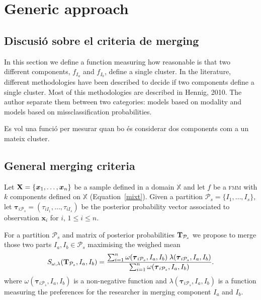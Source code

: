 \documentclass[submit]{smj}
\theoremstyle{definition}
\newcommand{\m}[1]{\boldsymbol{#1}}
\newcommand{\fmm}{\textsc{fmm}\xspace}
\begin{document}
\section{Generic approach}\label{generic_merging}
\subsection{Discusió sobre el criteria de merging}

In this section we define a function measuring how reasonable is that two different components, $f_{I_a}$ and $f_{I_b}$, define a single cluster. In the literature, different methodologies have been described to decide if two components define a single cluster. Most of this methodologies are described in Hennig, 2010. The author separate them between two categories: models based on modality and models based on missclassification probabilities.


Es vol una funció per mesurar quan bo és considerar dos components com a un mateix cluster.

\subsection{General merging criteria}\label{merging_criteria}

Let $\text{\textbf{X}} = \{\m x_1,\dots,\m x_n \}$ be a sample defined in  a domain $\mathbb{X}$ and let $f$ be a \fmm with $k$ components defined on $\mathbb{X}$ (Equation~\ref{mixt}). Given a partition $\mathcal{P}_s = \{I_1, \dots, I_s\}$, let $\m\tau_{i \mathcal{P}_s}= \left( \tau_{i I_1} , \dots, \tau_{i I_s}  \right)$ be the posterior probability vector associated to observation $\m x_i$ for $i$, $1\leq i \leq n $.

For a partition $\mathcal{P}_s$  and matrix of posterior probabilities $\text{\textbf{T}}_{\mathcal{P}_s}$ we propose to merge those two parts $I_a, I_b \in \mathcal{P}_s$ maximising the weighed mean
\begin{equation}\label{unifying_equation}
S_{\omega, \lambda}( \text{\textbf{T}}_{\mathcal{P}_s},  I_a,  I_b) = \frac{\sum_{i=1}^n \omega(\m\tau_{i \mathcal{P}_s}, I_a, I_b) \; \lambda(\m\tau_{i \mathcal{P}_s}, I_a, I_b)}{\sum_{i=1}^n \omega(\m\tau_{i \mathcal{P}_s}, I_a, I_b) }.
\end{equation}
where $\omega(\m\tau_{i \mathcal{P}_s}, I_a, I_b)$ is a non-negative function and $\lambda(\m\tau_{i \mathcal{P}_s}, I_a, I_b)$ is a function measuring the preferences for the researcher in merging component $I_a$ and $I_b$.
\end{document}
